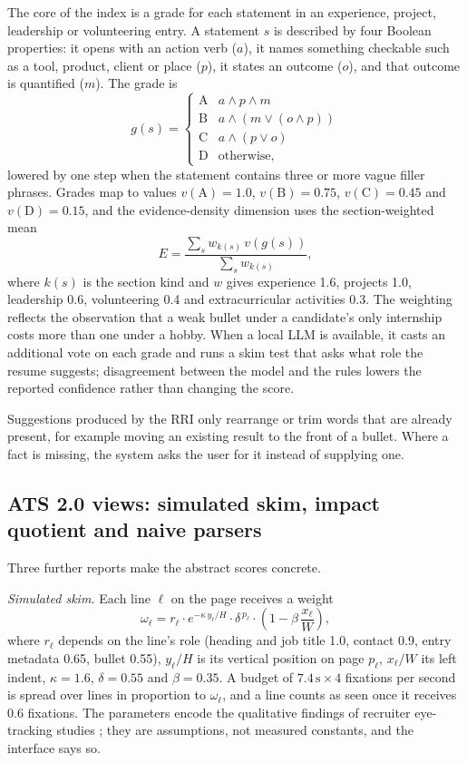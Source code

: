 \documentclass[3p,times,procedia]{elsarticle}
\begin{document}
The core of the index is a grade for each statement in an experience, project, leadership or volunteering entry. A statement $s$ is described by four Boolean properties: it opens with an action verb ($a$), it names something checkable such as a tool, product, client or place ($p$), it states an outcome ($o$), and that outcome is quantified ($m$). The grade is
\begin{equation}
g(s)=\begin{cases}
\mathrm{A} & a \wedge p \wedge m\\
\mathrm{B} & a \wedge \left(m \vee (o \wedge p)\right)\\
\mathrm{C} & a \wedge (p \vee o)\\
\mathrm{D} & \text{otherwise,}
\end{cases}
\end{equation}
lowered by one step when the statement contains three or more vague filler phrases. Grades map to values $v(\mathrm{A})=1.0$, $v(\mathrm{B})=0.75$, $v(\mathrm{C})=0.45$ and $v(\mathrm{D})=0.15$, and the evidence-density dimension uses the section-weighted mean
\begin{equation}
E=\frac{\sum_{s} w_{k(s)}\, v(g(s))}{\sum_{s} w_{k(s)}},
\end{equation}
where $k(s)$ is the section kind and $w$ gives experience 1.6, projects 1.0, leadership 0.6, volunteering 0.4 and extracurricular activities 0.3. The weighting reflects the observation that a weak bullet under a candidate's only internship costs more than one under a hobby. When a local LLM is available, it casts an additional vote on each grade and runs a skim test that asks what role the resume suggests; disagreement between the model and the rules lowers the reported confidence rather than changing the score.

Suggestions produced by the RRI only rearrange or trim words that are already present, for example moving an existing result to the front of a bullet. Where a fact is missing, the system asks the user for it instead of supplying one.

\subsection{ATS 2.0 views: simulated skim, impact quotient and naive parsers}
Three further reports make the abstract scores concrete.

\textit{Simulated skim.} Each line $\ell$ on the page receives a weight
\begin{equation}
\omega_\ell = r_\ell \cdot e^{-\kappa\, y_\ell / H}\cdot \delta^{\,p_\ell}\cdot \left(1-\beta\,\frac{x_\ell}{W}\right),
\end{equation}
where $r_\ell$ depends on the line's role (heading and job title 1.0, contact 0.9, entry metadata 0.65, bullet 0.55), $y_\ell/H$ is its vertical position on page $p_\ell$, $x_\ell/W$ its left indent, $\kappa=1.6$, $\delta=0.55$ and $\beta=0.35$. A budget of $7.4\,\mathrm{s}\times 4$ fixations per second is spread over lines in proportion to $\omega_\ell$, and a line counts as seen once it receives 0.6 fixations. The parameters encode the qualitative findings of recruiter eye-tracking studies \cite{ladders2018}; they are assumptions, not measured constants, and the interface says so.
\end{document}
